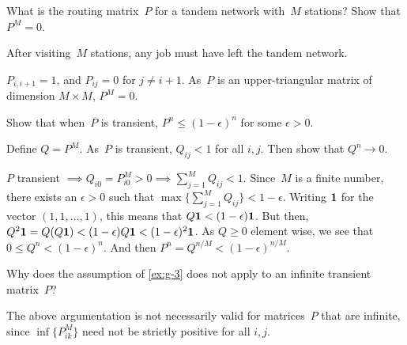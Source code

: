 \documentclass[queueing-book.tex]{subfiles}
\begin{document}
\begin{exercise}
What is the  routing matrix~$P$ for a tandem network with~$M$ stations? Show that $P^M = 0$.
\begin{hint}
After visiting~$M$ stations, any job must have left the tandem network.
\end{hint}
\begin{solution}
$P_{i, i+1} = 1$, and $P_{i j} = 0$ for $j\neq i+1$. As~$P$ is an upper-triangular matrix of dimension $M\times M$, $P^M =0$.
\end{solution}
\end{exercise}



\begin{exercise}\label{ex:g-3}
Show that when~$P$ is transient, $P^n \leq (1-\epsilon)^n$ for some $\epsilon > 0$.
\begin{hint}
  Define $Q= P^M$. As~$P$ is transient, $Q_{ij} < 1$ for all $i, j$. Then show that $Q^n \to 0$.
\end{hint}
\begin{solution}
  $P$ transient $\implies Q_{i0} = P_{i0}^M > 0 \implies \sum_{j=1}^M Q_{ij} < 1$.
  Since~$M$ is a finite number, there exists an $\epsilon>0$ such that $\max\{\sum_{j=1}^M Q_{ij}\} < 1-\epsilon$.
  Writing $\bf 1$ for the vector $(1,1,\ldots, 1)$, this  means that $Q{\bf 1} < (1-\epsilon) {\bf 1}$.
  But then, $ Q^{2} {\bf 1} = Q(Q{\bf 1}) < (1-\epsilon) Q{\bf 1} < (1-\epsilon)^2 {\bf 1}$.
As $Q\geq 0$ element wise, we see that $0\leq Q^n < (1-\epsilon)^n$. And then $P^n = Q^{n/M} < (1-\epsilon)^{n/M}$.
\end{solution}
\end{exercise}




\begin{exercise}
  Why does the assumption of \cref{ex:g-3} does not apply to an infinite transient matrix~$P$?
\begin{solution}
  The above argumentation is not necessarily valid for matrices~$P$ that are infinite, since $\inf\{P^{M}_{ik}\}$ need not be strictly positive for all $i, j$.
\end{solution}
\end{exercise}



\end{document}
